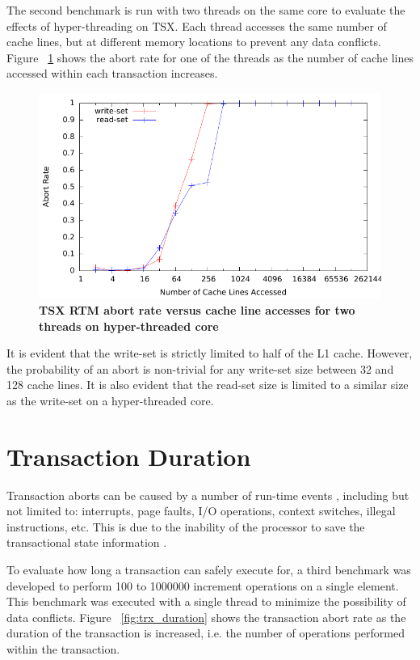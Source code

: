 \documentclass[11pt]{book}
\begin{document}
The second benchmark is run with two threads on the same core to evaluate the effects of
hyper-threading on TSX.  Each thread accesses the same number of cache lines, but at
different memory locations to prevent any data conflicts. Figure ~\ref{fig:trx_size_ht}
shows the abort rate for one of the threads as the number of cache lines accessed within
each transaction increases.

\begin{figure}[H]
    \centering
    \graphicspath{ {./figures/} }
    \includegraphics[width=\textwidth,height=\textheight,keepaspectratio]{trxSize_hyperthreaded}
    \caption{\textbf{TSX RTM abort rate versus cache line accesses for two 
    threads on hyper-threaded core}}
    \label{fig:trx_size_ht}
\end{figure}

It is evident that the write-set is strictly limited to half of the L1 cache.  However,
the probability of an abort is non-trivial for any write-set size between 32 and 128 cache
lines.  It is also evident that the read-set size is limited to a similar size as the
write-set on a hyper-threaded core.

\section{Transaction Duration}

Transaction aborts can be caused by a number of run-time events \cite{intel_prog_ref},
including but not limited to: interrupts, page faults, I/O operations, context switches,
illegal instructions, etc.  This is due to the inability of the processor to save the
transactional state information \cite{schwahn}.

To evaluate how long a transaction can safely execute for, a third benchmark was developed
to perform 100 to 1000000 increment operations on a single element.  This benchmark was
executed with a single thread to minimize the possibility of data conflicts. Figure
~\ref{fig:trx_duration} shows the transaction abort rate as the duration of the
transaction is increased, i.e. the number of operations performed within the transaction.
\end{document}
